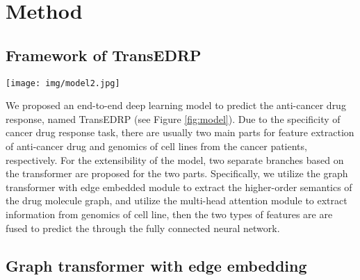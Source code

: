 \documentclass{article}
\begin{document}
\section{Method}

\subsection{Framework of TransEDRP }

\begin{figure*}[!ht]
    \centering
    \texttt{[image: img/model2.jpg]}
    \caption{The framework illustration for TransEDRP. The inputs of the model are the drug SMILES string and the genomics sequence of cell lines, respectively. Our model therefore consists of three components: an encoder module for the drug, an encoder module for the genomics, and a prediction module for the interactions between the drugs and the genomics.}
    \label{fig:model}
\end{figure*}


We proposed an end-to-end deep learning model to predict the anti-cancer drug response, named TransEDRP (see Figure \ref{fig:model}). Due to the specificity of  cancer drug response task, there are usually two main parts for feature extraction of anti-cancer drug and genomics of cell lines from the cancer patients, respectively. For the extensibility of the model, two separate branches based on the transformer are proposed for the two parts. Specifically,  we utilize the graph transformer with edge embedded module to extract the higher-order semantics of the drug molecule graph,  and utilize the multi-head attention module to extract information from genomics of cell line, then the two types of features are are fused to predict the  through the fully connected neural network.






















\subsection{Graph transformer with edge embedding}
\end{document}
